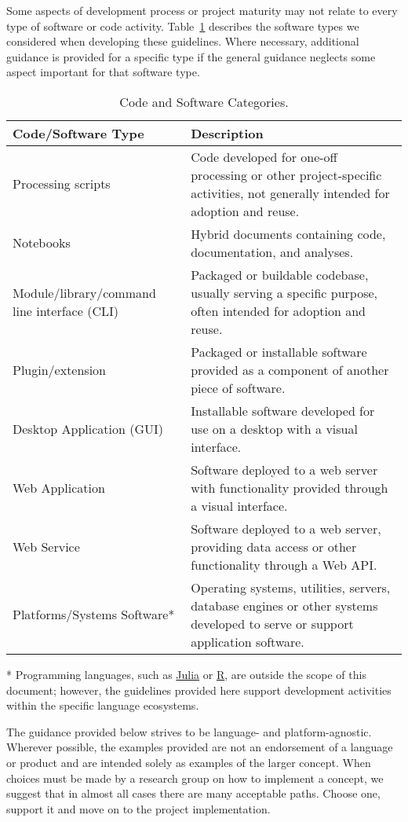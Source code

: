 \documentclass{article}
\begin{document}
Some aspects of development process or project maturity may not relate to every type of software or code activity. Table~\ref{table2} describes the software types we considered when developing these guidelines. Where necessary, additional guidance is provided for a specific type if the general guidance neglects some aspect important for that software type. 
\FloatBarrier\clearpage
\begin{table}[!hbp]
\centering
\caption{Code and Software Categories.}
\begin{tabularx}{\textwidth}{XX}
\hline
\textbf{Code/Software Type} & \textbf{Description} \\ \hline
Processing scripts & Code developed for one-off processing or other project-specific activities, not generally intended for adoption and reuse. \\ \hline
Notebooks & Hybrid documents containing code, documentation, and analyses. \\ \hline
Module/library/command line interface (CLI) & Packaged or buildable codebase, usually serving a specific purpose, often intended for adoption and reuse. \\ \hline
Plugin/extension & Packaged or installable software provided as a component of another piece of software. \\ \hline
Desktop Application (GUI) & Installable software developed for use on a desktop with a visual interface. \\ \hline
Web Application & Software deployed to a web server with functionality provided through a visual interface. \\ \hline
Web Service & Software deployed to a web server, providing data access or other functionality through a Web API. \\ \hline
Platforms/Systems Software* & Operating systems, utilities, servers, database engines or other systems developed to serve or support application software. \\ \hline
\end{tabularx}
\label{table2}
\begin{flushleft}
* Programming languages, such as \href{http://julialang.org/} {Julia} or \href{https://www.r-project.org/} {R}, are outside the scope of this document; however, the guidelines provided here support development activities within the specific language ecosystems. 
\end{flushleft}
\end{table}

The guidance provided below strives to be language- and platform-agnostic. Wherever possible, the examples provided are not an endorsement of a language or product and are intended solely as examples of the larger concept. When choices must be made by a research group on how to implement a concept, we suggest that in almost all cases there are many acceptable paths. Choose one, support it and move on to the project implementation. 
 
\end{document}
